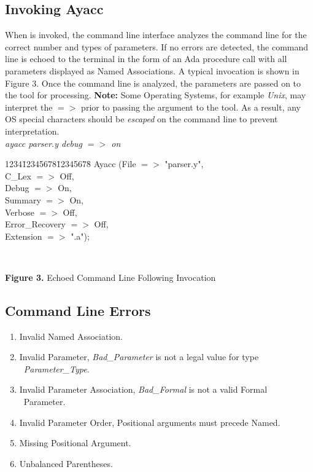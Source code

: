 \subsection{Invoking Ayacc}
When \ayacc is invoked, the command line interface analyzes the
command line for the correct number and types of parameters.  If no errors
are detected, the command line is echoed to the terminal in the form of
an Ada procedure call with all parameters displayed as Named Associations.
A typical invocation is shown in Figure 3.
Once the command line is analyzed,
the parameters are passed on to the tool for processing.  {\bf Note:} Some
Operating Systems, for example {\it Unix}, may
interpret the {\bf $=>$} prior to passing the argument to the tool.  As a
result, any OS special characters should be {\it escaped} on the command
line to prevent interpretation.
\newpage
\noindent\hspace{-0.05in}\hrulefill\hspace{0.0in}\\
\vspace{-0.2in}
{\it ayacc  parser.y debug $=>$ \footnotemark on}\\

\begin{tabbing}
1234\=12345678\=12345678\= \kill
\>  Ayacc (\>File\>      $=>$ "parser.y",\\
\>\>         C\_Lex     $=>$ Off,\\
\>\>         Debug     $=>$ On,\\
\>\>         Summary   $=>$ On,\\
\>\>         Verbose   $=>$ Off,\\
\>\>         Error\_Recovery   $=>$ Off,\\
\>\>         Extension $=>$ ".a");\\
\end{tabbing}
\hspace{-0.05in}\hrulefill\hspace{0.0in}\\
\centerline{{\bf Figure 3.} Echoed Command Line Following Invocation}
\subsection{Command Line Errors}
{\bf
\begin{enumerate}
\item Invalid Named Association.
\item Invalid Parameter, {\it Bad\_Parameter} is not a legal value for type \
{\it Parameter\_Type}.
\item Invalid Parameter Association, {\it Bad\_Formal} is not a valid Formal \
Parameter.
\item Invalid Parameter Order, Positional arguments must precede Named.
\item Missing Positional Argument.
\item Unbalanced Parentheses.
\end{enumerate}
}
